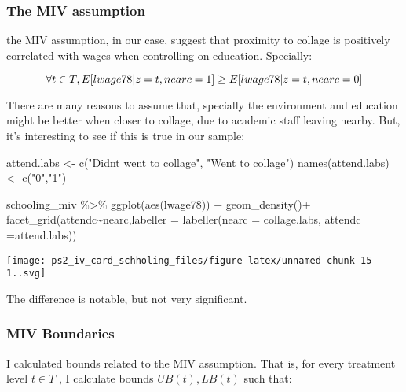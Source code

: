 \documentclass[
]{article}
\newenvironment{Shaded}{\begin{snugshade}}{\end{snugshade}}
\newcommand{\AttributeTok}[1]{\textcolor[rgb]{0.77,0.63,0.00}{#1}}
\newcommand{\FunctionTok}[1]{\textcolor[rgb]{0.00,0.00,0.00}{#1}}
\newcommand{\NormalTok}[1]{#1}
\newcommand{\OtherTok}[1]{\textcolor[rgb]{0.56,0.35,0.01}{#1}}
\newcommand{\SpecialCharTok}[1]{\textcolor[rgb]{0.00,0.00,0.00}{#1}}
\newcommand{\StringTok}[1]{\textcolor[rgb]{0.31,0.60,0.02}{#1}}
\begin{document}
\hypertarget{the-miv-assumption}{%
\subsubsection{The MIV assumption}\label{the-miv-assumption}}

the MIV assumption, in our case, suggest that proximity to collage is
positively correlated with wages when controlling on education.
Specially:

\[
\forall t \in T, \\ E[lwage78|z=t, nearc = 1 ] \ge E[lwage78|z=t, nearc = 0 ]
\]

There are many reasons to assume that, specially the environment and
education might be better when closer to collage, due to academic staff
leaving nearby. But, it's interesting to see if this is true in our
sample:

\begin{Shaded}
\begin{Highlighting}[]
\NormalTok{attend.labs }\OtherTok{\textless{}{-}} \FunctionTok{c}\NormalTok{(}\StringTok{"Didn\textquotesingle{}t went to collage"}\NormalTok{, }\StringTok{"Went to collage"}\NormalTok{)}
\FunctionTok{names}\NormalTok{(attend.labs) }\OtherTok{\textless{}{-}} \FunctionTok{c}\NormalTok{(}\StringTok{"0"}\NormalTok{,}\StringTok{"1"}\NormalTok{)}

\NormalTok{schooling\_miv }\SpecialCharTok{\%\textgreater{}\%} 
  \FunctionTok{ggplot}\NormalTok{(}\FunctionTok{aes}\NormalTok{(lwage78)) }\SpecialCharTok{+}
  \FunctionTok{geom\_density}\NormalTok{()}\SpecialCharTok{+}
  \FunctionTok{facet\_grid}\NormalTok{(attendc}\SpecialCharTok{\textasciitilde{}}\NormalTok{nearc,}\AttributeTok{labeller =} \FunctionTok{labeller}\NormalTok{(}\AttributeTok{nearc =}\NormalTok{ collage.labs, }\AttributeTok{attendc =}\NormalTok{attend.labs))}
\end{Highlighting}
\end{Shaded}

\texttt{[image: ps2\_iv\_card\_schholing\_files/figure-latex/unnamed-chunk-15-1..svg]}

The difference is notable, but not very significant.

\hypertarget{miv-boundaries}{%
\subsubsection{MIV Boundaries}\label{miv-boundaries}}

I calculated bounds related to the MIV assumption. That is, for every
treatment level \(t \in T\) , I calculate bounds \(UB(t),LB(t)\) such
that:
\end{document}
